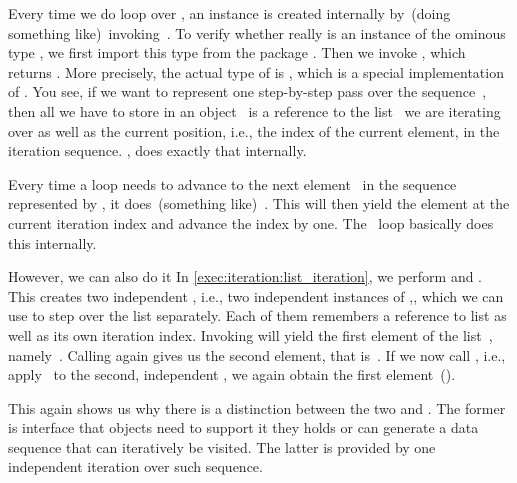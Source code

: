 Every time we do loop over , an  instance is created internally by~(doing something like)~invoking~.
To verify whether  really is an instance of the ominous type , we first import this type from the package .
Then we invoke , which returns .
More precisely, the actual type of  is , which is a special implementation of .
You see, if we want to represent one step-by-step pass over the sequence~, then all we have to store in an object~ is a reference to the list~ we are iterating over as well as the current position, i.e., the index of the current element, in the iteration sequence.
, does exactly that internally.

Every time a loop needs to advance to the next element~ in the sequence represented by , it does~(something like)~.
This will then yield the element at the current iteration index and advance the index by one.
The ~loop basically does this internally.

However, we can also do it 
In \cref{exec:iteration:list_iteration}, we perform  and .
This creates two independent , i.e., two independent instances of ,, which we can use to step over the list separately.
Each of them remembers a reference to list  as well as its own iteration index.
Invoking  will yield the first element of the list~, namely~.
Calling  again gives us the second element, that is~.
If we now call , i.e., apply~ to the second, independent , we again obtain the first element~().

This again shows us why there is a distinction between the two   and .
The former is interface that objects need to support it they holds or can generate a data sequence that can iteratively be visited.
The latter is provided by one independent iteration over such sequence.

